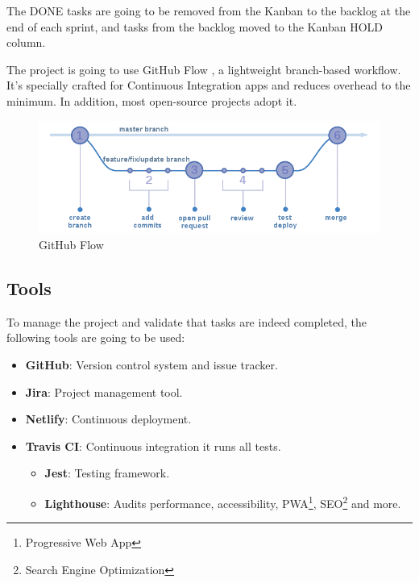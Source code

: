 The DONE tasks are going to be removed from the Kanban to the backlog at the end of each sprint, and tasks from the backlog moved to the Kanban HOLD column.

The project is going to use GitHub Flow \cite{github-flow}, a lightweight branch-based workflow. It's specially crafted for Continuous Integration apps and reduces overhead to the minimum. In addition, most open-source projects adopt it.
\vspace*{\fill}
\begin{figure}[ht!]
    \center
    \includegraphics[width=1\columnwidth]{media/github-flow.png}
    \caption[GitHub Flow]{GitHub Flow \cite{github-flow}}
    \label{github-flow}
\end{figure}
\vspace*{\fill}

\newpage
\subsection{Tools}
To manage the project and validate that tasks are indeed completed, the following tools are going to be used:
\begin{itemize}
    \item \textbf{GitHub}: Version control system and issue tracker.
    \item \textbf{Jira}: Project management tool.
    \item \textbf{Netlify}: Continuous deployment.
    \item \textbf{Travis CI}: Continuous integration it runs all tests.
    \begin{itemize}
        \item \textbf{Jest}: Testing framework.
        \item \textbf{Lighthouse}: Audits performance, accessibility, PWA\footnote{Progressive Web App}, SEO\footnote{Search Engine Optimization} and more.
    \end{itemize}
\end{itemize}

